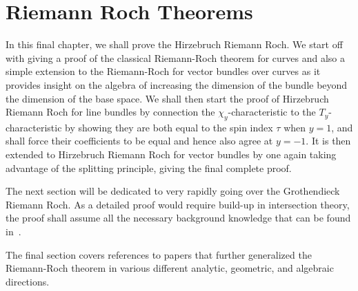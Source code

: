 \documentclass{book}
\begin{document}
%


\chapter{Riemann Roch Theorems}\label{cha:RR}


In this final chapter, we shall prove the Hirzebruch Riemann Roch. We start off with giving a proof of the
classical Riemann-Roch theorem for curves and also a simple extension to the Riemann-Roch for vector bundles
over curves as it provides insight on the algebra of increasing the dimension of the bundle beyond the
dimension of the base space. We shall then start the proof of Hirzebruch Riemann Roch for line bundles by connection the
$\chi_y$-characteristic to the $T_y$-characteristic by showing they are both equal to the spin index $\tau$
when $y =1$, and shall force their coefficients to be equal and hence also agree at $y=-1$. It is then extended to
Hirzebruch Riemann Roch for vector bundles by one again taking advantage of the splitting principle, giving
the final complete proof.

The next section will be dedicated to very rapidly going over the Grothendieck Riemann
Roch. As a detailed proof would require build-up in intersection theory, the proof shall assume all the
necessary background knowledge that can be found in~\cite{fultonIntersectionTheory1984}.


The final section covers references to papers that further generalized the Riemann-Roch theorem in various
different analytic, geometric, and algebraic directions.
\end{document}
